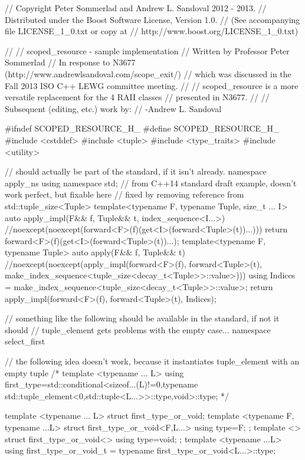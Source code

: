 \documentclass[ebook,11pt,article]{memoir}
\begin{document}
\begin{codeblock}
// Copyright Peter Sommerlad and Andrew L. Sandoval 2012 - 2013.
// Distributed under the Boost Software License, Version 1.0.
//   (See accompanying file LICENSE_1_0.txt or copy at
//         http://www.boost.org/LICENSE_1_0.txt)

//
// scoped_resource - sample implementation
// Written by Professor Peter Sommerlad
// In response to N3677 (http://www.andrewlsandoval.com/scope_exit/)
// which was discussed in the Fall 2013 ISO C++ LEWG committee meeting.
//
// scoped_resource is a more versatile replacement for the 4 RAII classes
// presented in N3677.
//
// Subsequent (editing, etc.) work by:
// -Andrew L. Sandoval


#ifndef SCOPED_RESOURCE_H_
#define SCOPED_RESOURCE_H_
#include <cstddef>
#include <tuple>
#include <type_traits>
#include <utility>

// should actually be part of the standard, if it isn't already.
namespace apply_ns{
using namespace std;
// from C++14 standard draft example, doesn't work perfect, but fixable here
// fixed by removing reference from std::tuple_size<Tuple>
template<typename F, typename Tuple, size_t ... I>
auto apply_impl(F&& f, Tuple&& t, index_sequence<I...>)
//noexcept(noexcept(forward<F>(f)(get<I>(forward<Tuple>(t))...)))
{
	return forward<F>(f)(get<I>(forward<Tuple>(t))...);
}
template<typename F, typename Tuple>
auto apply(F&& f, Tuple&& t)
//noexcept(noexcept(apply_impl(forward<F>(f), forward<Tuple>(t), make_index_sequence<tuple_size<decay_t<Tuple>>::value>{})))
{
  using Indices = make_index_sequence<tuple_size<decay_t<Tuple>>::value>;
  return apply_impl(forward<F>(f), forward<Tuple>(t), Indices{});
}
}

// something like the following should be available in the standard, if not it should
// tuple_element gets problems with the empty case...
namespace select_first{
// the following idea doesn't work, because it instantiates tuple_element with an empty tuple
/*
template <typename ... L>
using first_type=std::conditional<sizeof...(L)!=0,typename std::tuple_element<0,std::tuple<L...>>::type,void>::type;
 */

template <typename ... L> struct first_type_or_void;
template <typename F, typename ...L>
struct first_type_or_void<F,L...>{
	using type=F;
};
template <> struct first_type_or_void<>{
	using type=void;
};
template <typename ...L>
using first_type_or_void_t = typename first_type_or_void<L...>::type;
}


\end{codeblock}
\end{document}
